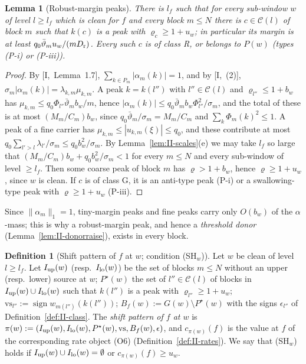 \documentclass[10pt]{amsart}
\newtheorem{lemma}[theorem]{Lemma}
\theoremstyle{definition}
\newtheorem{definition}[theorem]{Definition}
\theoremstyle{remark}
\newcommand{\sgn}{\operatorname{sign}}
\begin{document}
\begin{lemma}[Robust-margin peaks]\label{lem:II-donorpeak}
There is $l_f$ such that for every sub-window $w$ of level $l\ge l_f$ which
is clean for $f$ and every block $m\le N$ there is $c\in\mathcal C(l)$ of
block $m$ such that $k(c)$ is a peak with $\varrho_c\ge1+u_w$; in particular
its margin is at least $q_0\bar\vartheta_mu_w/(mD_{\rm r})$.  Every such $c$ is of
class R, or belongs to $P(w)$ (types (P-i) or (P-iii)).
\end{lemma}

\begin{proof}
By [I,~Lemma~1.7], $\sum_{k\in P_m}|\alpha_m(k)|=1$, and by [I,~(2)],
$\sigma_m|\alpha_m(k)|=\lambda_{k,m}\mu_{k,m}$.  A peak $k=k(l'')$ with
$l''\in\mathcal C(l)$ and $\varrho_{l''}\le1+b_w$ has $\mu_{k,m}\le q_0
\Phi_{l''}\bar\vartheta_mb_w/m$, hence $|\alpha_m(k)|\le q_0\bar\vartheta_mb_w\Phi_{l''}^2/
\sigma_m$, and the total of these is at most $(M_m/C_m)b_w$, since
$q_0\bar\vartheta_m/\sigma_m=M_m/C_m$ and $\sum_k\Phi_m(k)^2\le1$.  A peak of a
fine carrier has $\mu_{k,m}\le|u_{k,m}(\xi)|\le q_0$, and these contribute
at most $q_0\sum_{l'>l}\lambda_{l'}/\sigma_m\le q_0b_w^2/\sigma_m$.  By
Lemma~\ref{lem:II-scales}(e) we may take $l_f$ so large that $(M_m/C_m)b_w+
q_0b_w^2/\sigma_m<1$ for every $m\le N$ and every sub-window of level
$\ge l_f$.  Then some coarse peak of block $m$ has $\varrho>1+b_w$, hence
$\varrho\ge1+u_w$, since $w$ is clean.  If $c$ is of class G, it is an
anti-type peak (P-i) or a swallowing-type peak with $\varrho\ge1+u_w$ (P-iii).
\end{proof}

Since $\|\alpha_m\|_1=1$, tiny-margin peaks and fine peaks carry only
$O(b_w)$ of the $\alpha$-mass; this is why a robust-margin peak, and hence
a \emph{threshold donor} (Lemma~\ref{lem:II-donorraise}), exists in every
block.

\begin{definition}[Shift pattern of $f$ at $w$; condition (SH$_w$)]
\label{def:II-shiftpattern}
Let $w$ be clean of level $l\ge l_f$.  Let $I_{\rm up}(w)$ (resp.\
$I_{\rm lo}(w)$) be the set of blocks $m\le N$ without an upper (resp.\
lower) source at $w$; $P^\star(w)$ the set of $l''\in\mathcal C(l)$ of
blocks in $I_{\rm up}(w)\cup I_{\rm lo}(w)$ such that $k(l'')$ is a peak
with $\varrho_{l''}\ge1+u_w$; $\mathrm{vs}_{l''}:=\sgn w_{m(l'')}(k(l''))$;
$B_f(w):=G(w)\setminus P^\star(w)$ with the signs $\epsilon_{l''}$ of
Definition~\ref{def:II-class}.  The \emph{shift pattern of $f$ at $w$} is
$\pi(w):=(I_{\rm up}(w),I_{\rm lo}(w),P^\star(w),\mathrm{vs},B_f(w),
\epsilon)$, and $c_{\pi(w)}(f)$ is the value at $f$ of the corresponding
rate object (O6) (Definition~\ref{def:II-rates}).  We say that
\textup{(SH$_w$)} holds if $I_{\rm up}(w)\cup I_{\rm lo}(w)=\emptyset$ or
$c_{\pi(w)}(f)\ge u_w$.
\end{definition}
\end{document}
